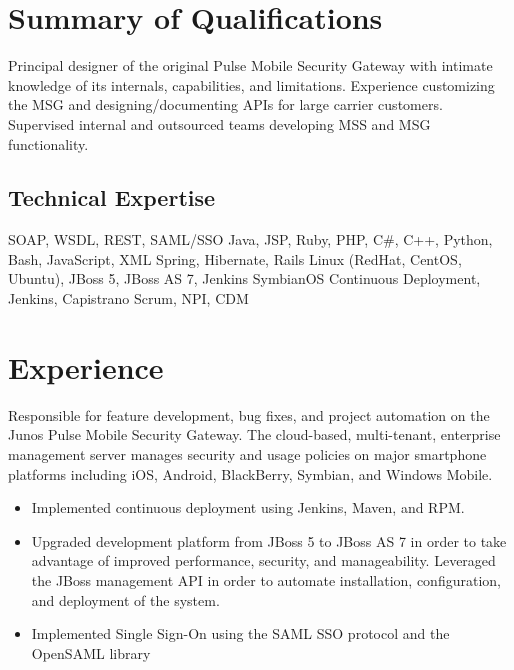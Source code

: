 \documentclass[12pt,letter,sans]{moderncv}
\begin{document}
\makecvtitle

\section{Summary of Qualifications}

Principal designer of the original Pulse Mobile Security Gateway with intimate
knowledge of its internals, capabilities, and limitations.  Experience
customizing the MSG and designing/documenting APIs for large carrier customers.
Supervised internal and outsourced teams developing MSS and MSG functionality.

\subsection{Technical Expertise}

 { SOAP, WSDL, REST, SAML/SSO }
 { Java, JSP, Ruby, PHP, C\#, C++, Python, Bash, JavaScript, XML }
 { Spring, Hibernate, Rails }
 { Linux (RedHat, CentOS, Ubuntu), JBoss 5, JBoss AS 7, Jenkins }
 { SymbianOS }
 { Continuous Deployment, Jenkins, Capistrano }
 { Scrum, NPI, CDM }

\section{Experience}


Responsible for feature development, bug fixes, and project automation on the
Junos Pulse Mobile Security Gateway.  The cloud-based, multi-tenant, enterprise
management server manages security and usage policies on major
smartphone platforms including iOS, Android, BlackBerry, Symbian, and Windows
Mobile.

\begin{itemize}

    \item Implemented continuous deployment using Jenkins, Maven, and RPM.

    \item Upgraded development platform from JBoss 5 to JBoss AS 7 in order to
        take advantage of improved performance, security, and manageability.
        Leveraged the JBoss management API in order to automate installation,
        configuration, and deployment of the system.

    \item Implemented Single Sign-On using the SAML SSO protocol and the OpenSAML
        library

\end{itemize}
\end{document}
